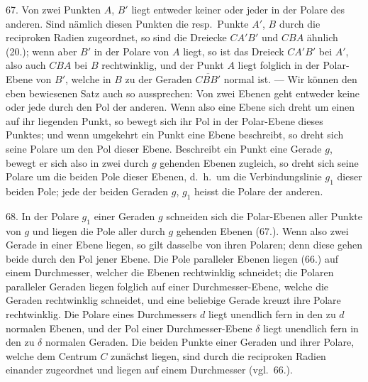 67. Von zwei Punkten $A$, $B'$ liegt entweder keiner
oder jeder in der Polare des anderen. Sind n\"amlich diesen
Punkten die resp.\ Punkte $A'$, $B$ durch die reciproken Radien
zugeordnet, so sind die Dreiecke $CA'B'$ und $CBA$ \"ahnlich
(20.); wenn aber $B'$ in der Polare von $A$ liegt, so ist das
Dreieck $CA'B'$ bei $A'$, also auch $CBA$ bei $B$ rechtwinklig,
und der Punkt $A$ liegt folglich in der Polar-Ebene von $B'$,
welche in $B$ zu der Geraden $\overline{CBB'}$ normal ist. --- Wir
k\"onnen den eben bewiesenen Satz auch so aussprechen: Von
zwei Ebenen geht entweder keine oder jede durch den Pol
der anderen. Wenn also eine Ebene sich dreht um einen
auf ihr liegenden Punkt, so bewegt sich ihr Pol in der Polar-Ebene
dieses Punktes; und wenn umgekehrt ein Punkt
eine Ebene beschreibt, so dreht sich seine Polare um den
Pol dieser Ebene. Beschreibt ein Punkt eine Gerade $g$, bewegt
er sich also in zwei durch $g$ gehenden Ebenen zugleich,
so dreht sich seine Polare um die beiden Pole dieser Ebenen,
d.~h.\ um die Verbindungslinie $g_1$ dieser beiden Pole; jede
der beiden Geraden $g$, $g_1$ heisst die {\glqq}Polare{\grqq} der anderen.

68. In der Polare $g_1$ einer Geraden $g$ schneiden sich
die Polar-Ebenen aller Punkte von $g$ und liegen die Pole
aller durch $g$ gehenden Ebenen (67.). Wenn also zwei Gerade
in einer Ebene liegen, so gilt dasselbe von ihren Polaren;
denn diese gehen beide durch den Pol jener Ebene.
Die Pole paralleler Ebenen liegen (66.) auf einem Durchmesser,
welcher die Ebenen rechtwinklig schneidet; die Polaren
paralleler Geraden liegen folglich auf einer Durchmesser-Ebene,
welche die Geraden rechtwinklig schneidet, und eine
beliebige Gerade kreuzt ihre Polare rechtwinklig. Die Polare
eines Durchmessers $d$ liegt unendlich fern in den zu $d$ normalen
Ebenen, und der Pol einer Durchmesser-Ebene $\delta$ liegt
unendlich fern in den zu $\delta$ normalen Geraden. Die beiden
Punkte einer Geraden und ihrer Polare, welche dem Centrum
$C$ zun\"achst liegen, sind durch die reciproken Radien einander
zugeordnet und liegen auf einem Durchmesser (vgl.\ 66.).

